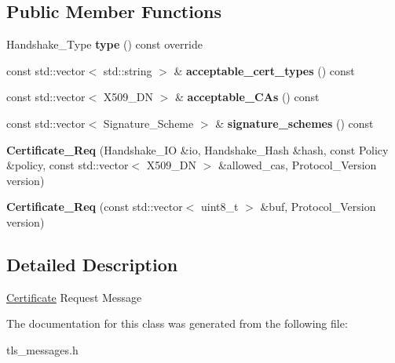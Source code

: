 \subsection*{Public Member Functions}
\begin{DoxyCompactItemize}
\item 
\mbox{\label{class_botan_1_1_t_l_s_1_1_certificate___req_a4775bfa68f42b0cd5ca397af66f054ac}} 
Handshake\+\_\+\+Type {\bfseries type} () const override
\item 
\mbox{\label{class_botan_1_1_t_l_s_1_1_certificate___req_a91ad193bb1e925e44d96d5694df776ae}} 
const std\+::vector$<$ std\+::string $>$ \& {\bfseries acceptable\+\_\+cert\+\_\+types} () const
\item 
\mbox{\label{class_botan_1_1_t_l_s_1_1_certificate___req_adbe8291fd3d449658cb1b56fcf39f86c}} 
const std\+::vector$<$ X509\+\_\+\+DN $>$ \& {\bfseries acceptable\+\_\+\+C\+As} () const
\item 
\mbox{\label{class_botan_1_1_t_l_s_1_1_certificate___req_ac85d258c557adb28a4db14fe4b1e5bc8}} 
const std\+::vector$<$ Signature\+\_\+\+Scheme $>$ \& {\bfseries signature\+\_\+schemes} () const
\item 
\mbox{\label{class_botan_1_1_t_l_s_1_1_certificate___req_aceabb73e01693471af3201a7a81c0792}} 
{\bfseries Certificate\+\_\+\+Req} (Handshake\+\_\+\+IO \&io, Handshake\+\_\+\+Hash \&hash, const Policy \&policy, const std\+::vector$<$ X509\+\_\+\+DN $>$ \&allowed\+\_\+cas, Protocol\+\_\+\+Version version)
\item 
\mbox{\label{class_botan_1_1_t_l_s_1_1_certificate___req_ad633ad08f5ccf7273534c3d952e32b8a}} 
{\bfseries Certificate\+\_\+\+Req} (const std\+::vector$<$ uint8\+\_\+t $>$ \&buf, Protocol\+\_\+\+Version version)
\end{DoxyCompactItemize}


\subsection{Detailed Description}
\hyperlink{class_botan_1_1_t_l_s_1_1_certificate}{Certificate} Request Message 

The documentation for this class was generated from the following file\+:\begin{DoxyCompactItemize}
\item 
tls\+\_\+messages.\+h\end{DoxyCompactItemize}

